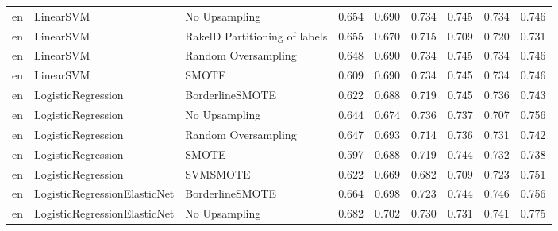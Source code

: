 \begin{tabular}{lllllllll}
      en &                       LinearSVM &                 No Upsampling & 0.654 &                     0.690 &                 0.734 &                  0.745 &                                   0.734 &     0.746 \\
      en &                       LinearSVM & RakelD Partitioning of labels & 0.655 &                     0.670 &                 0.715 &                  0.709 &                                   0.720 &     0.731 \\
      en &                       LinearSVM &           Random Oversampling & 0.648 &                     0.690 &                 0.734 &                  0.745 &                                   0.734 &     0.746 \\
      en &                       LinearSVM &                         SMOTE & 0.609 &                     0.690 &                 0.734 &                  0.745 &                                   0.734 &     0.746 \\
      en &              LogisticRegression &               BorderlineSMOTE & 0.622 &                     0.688 &                 0.719 &                  0.745 &                                   0.736 &     0.743 \\
      en &              LogisticRegression &                 No Upsampling & 0.644 &                     0.674 &                 0.736 &                  0.737 &                                   0.707 &     0.756 \\
      en &              LogisticRegression &           Random Oversampling & 0.647 &                     0.693 &                 0.714 &                  0.736 &                                   0.731 &     0.742 \\
      en &              LogisticRegression &                         SMOTE & 0.597 &                     0.688 &                 0.719 &                  0.744 &                                   0.732 &     0.738 \\
      en &              LogisticRegression &                      SVMSMOTE & 0.622 &                     0.669 &                 0.682 &                  0.709 &                                   0.723 &     0.751 \\
      en &    LogisticRegressionElasticNet &               BorderlineSMOTE & 0.664 &                     0.698 &                 0.723 &                  0.744 &                                   0.746 &     0.756 \\
      en &    LogisticRegressionElasticNet &                 No Upsampling & 0.682 &                     0.702 &                 0.730 &                  0.731 &                                   0.741 &     0.775 \\

\end{tabular}
